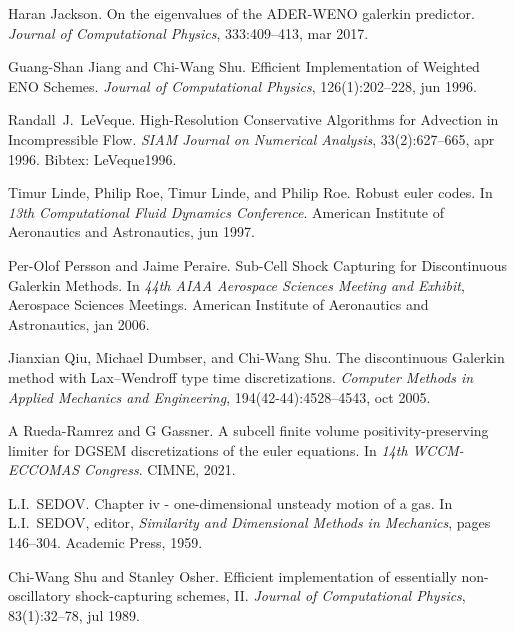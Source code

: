 \documentclass{beamer}
\newcommand{\tmtextit}[1]{{\itshape{#1}}}
\begin{document}
{{\begin{frame}
\begin{thebibliography}{10}
    Haran Jackson. {\newblock}On the eigenvalues of
    the ADER-WENO galerkin predictor. {\newblock}\tmtextit{Journal of
    Computational Physics}, 333:409--413, mar 2017.{\newblock}
    
    Guang-Shan Jiang  and  Chi-Wang Shu.
    {\newblock}Efficient Implementation of Weighted ENO Schemes.
    {\newblock}\tmtextit{Journal of Computational Physics}, 126(1):202--228,
    jun 1996.{\newblock}
    
    Randall~J.~LeVeque. {\newblock}High-Resolution
    Conservative Algorithms for Advection in Incompressible Flow.
    {\newblock}\tmtextit{SIAM Journal on Numerical Analysis}, 33(2):627--665,
    apr 1996. {\newblock}Bibtex: LeVeque1996.{\newblock}
    
    Timur Linde, Philip Roe, Timur Linde, and  Philip
    Roe. {\newblock}Robust euler codes. {\newblock}In \tmtextit{13th
    Computational Fluid Dynamics Conference}. American Institute of
    Aeronautics and Astronautics, jun 1997.{\newblock}
    
    Per-Olof Persson  and  Jaime Peraire.
    {\newblock}Sub-Cell Shock Capturing for Discontinuous Galerkin Methods.
    {\newblock}In \tmtextit{44th AIAA Aerospace Sciences Meeting and Exhibit},
    Aerospace Sciences Meetings. American Institute of Aeronautics and
    Astronautics, jan 2006.{\newblock}
    
    Jianxian Qiu, Michael Dumbser, and  Chi-Wang Shu.
    {\newblock}The discontinuous Galerkin method with Lax--Wendroff type time
    discretizations. {\newblock}\tmtextit{Computer Methods in Applied
    Mechanics and Engineering}, 194(42-44):4528--4543, oct 2005.{\newblock}
    
    A Rueda-Ramrez  and  G Gassner.
    {\newblock}A subcell finite volume positivity-preserving limiter for DGSEM
    discretizations of the euler equations. {\newblock}In \tmtextit{14th
    WCCM-ECCOMAS Congress}. CIMNE, 2021.{\newblock}
    
    L.I.~SEDOV. {\newblock}Chapter iv -
    one-dimensional unsteady motion of a gas. {\newblock}In  L.I.~SEDOV,
    editor, \tmtextit{Similarity and Dimensional Methods in Mechanics},  pages
    146--304. Academic Press, 1959.{\newblock}
    
    Chi-Wang Shu  and  Stanley Osher.
    {\newblock}Efficient implementation of essentially non-oscillatory
    shock-capturing schemes, II. {\newblock}\tmtextit{Journal of Computational
    Physics}, 83(1):32--78, jul 1989.{\newblock}
    

\end{thebibliography}
\end{frame}}}
\end{document}
